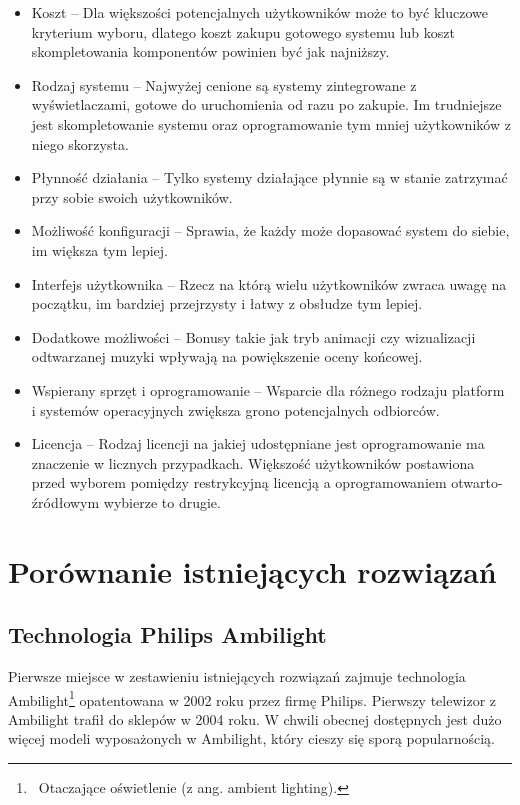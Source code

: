 \documentclass[12pt]{report}
\begin{document}
\begin{itemize}
	\item Koszt -- Dla większości potencjalnych użytkowników może to być kluczowe kryterium wyboru, dlatego koszt zakupu gotowego systemu lub koszt skompletowania komponentów powinien być jak najniższy.
	\item Rodzaj systemu -- Najwyżej cenione są systemy zintegrowane z wyświetlaczami, gotowe do uruchomienia od razu po zakupie. Im trudniejsze jest skompletowanie systemu oraz oprogramowanie tym mniej użytkowników z niego skorzysta.
	\item Płynność działania -- Tylko systemy działające płynnie są w stanie zatrzymać przy sobie swoich użytkowników.
	\item Możliwość konfiguracji -- Sprawia, że każdy może dopasować system do siebie, im większa tym lepiej.
	\item Interfejs użytkownika -- Rzecz na którą wielu użytkowników zwraca uwagę na początku, im bardziej przejrzysty i łatwy z obsłudze tym lepiej.
	\item Dodatkowe możliwości -- Bonusy takie jak tryb animacji czy wizualizacji odtwarzanej muzyki wpływają na powiększenie oceny końcowej.
	\item Wspierany sprzęt i oprogramowanie -- Wsparcie dla różnego rodzaju platform i systemów operacyjnych zwiększa grono potencjalnych odbiorców.
	\item Licencja -- Rodzaj licencji na jakiej udostępniane jest oprogramowanie ma znaczenie w licznych przypadkach. Większość użytkowników postawiona przed wyborem pomiędzy restrykcyjną licencją a oprogramowaniem otwarto-źródłowym wybierze to drugie.
\end{itemize} 

\section{Porównanie istniejących rozwiązań} \label{por}

\subsection{Technologia Philips Ambilight}

Pierwsze miejsce w zestawieniu istniejących rozwiązań zajmuje technologia Ambilight\footnote{~Otaczające oświetlenie (z ang. ambient lighting).} opatentowana w 2002 roku przez firmę Philips. Pierwszy telewizor z Ambilight trafił do sklepów w 2004 roku. W chwili obecnej dostępnych jest dużo więcej modeli wyposażonych w Ambilight, który cieszy się sporą popularnością.
\end{document}
